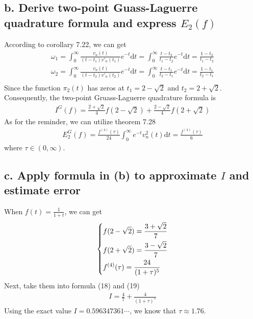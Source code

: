 \documentclass[twoside,a4paper]{article}
\newcommand{\dif}{\mathrm{d}}
\begin{document}
\subsection*{b. Derive two-point Guass-Laguerre quadrature formula and express $E_2(f)$}
According to corollary 7.22, we can get
\begin{gather}
\omega_1=\int_{0}^{\infty} \frac{v_n(t)}{(t-t_1)v'_n(t_1)} e^{-t} \dif t=\int_{0}^{\infty} \frac{t-t_2}{t_1-t_2}e^{-t} \dif t=\frac{1-t_2}{t_1-t_2}\\
\omega_2=\int_{0}^{\infty} \frac{v_n(t)}{(t-t_2)v'_n(t_2)} e^{-t} \dif t=\int_{0}^{\infty} \frac{t-t_1}{t_2-t_1}e^{-t} \dif t=\frac{1-t_1}{t_2-t_1}\\
\end{gather}
Since the function $\pi_2(t)$ has zeros at $t_1=2-\sqrt{2}$ and $t_2=2+\sqrt{2}$.
Consequently, the two-point Gruass-Laguerre quadrature formula is 
\begin{gather}
I^G(f)=\frac{2+\sqrt{2}}{4}f(2-\sqrt{2})+\frac{2-\sqrt{2}}{4}f(2+\sqrt{2})
\end{gather}
As for the reminder, we can utilize theorem 7.28
\begin{gather}
E_2^G(f)=\frac{f^{(4)}(\tau)}{24} \int_{0}^{\infty} e^{-t}v_n^2(t)\dif t=\frac{f^{(4)}(\tau)}{6}
\end{gather}
where $\tau \in (0,\infty)$.
\subsection*{c. Apply formula in (b) to approximate $I$ and estimate error}
When $f(t)=\frac{1}{1+t}$, we can get
\[ \left \{ \begin{lgathered}
f(2-\sqrt{2})=\frac{3+\sqrt{2}}{7}\\
f(2+\sqrt{2})=\frac{3-\sqrt{2}}{7}\\
f^{(4)}(\tau)=\frac{24}{(1+\tau)^5}
\end{lgathered} \right. \]
Next, take them into formula (18) and (19)
\begin{gather}
I=\frac{4}{7}+\frac{4}{(1+\tau)^5}
\end{gather}
Using the exact value $I=0.596347361\cdots$, we know that $\tau \approx 1.76$.
\end{document}
